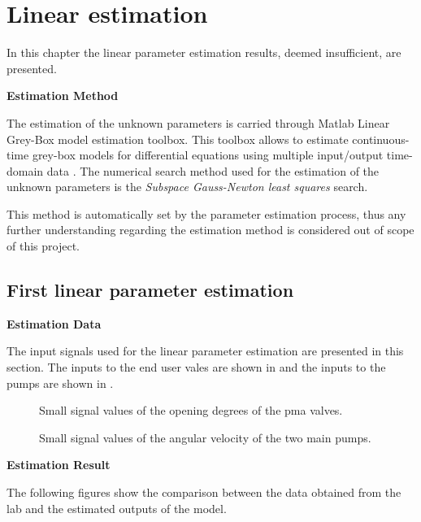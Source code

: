 \chapter{Linear estimation}
\label{LinResults_failed_attempts}
In this chapter the linear parameter estimation results, deemed insufficient, are presented.   

\textbf{Estimation Method}

The estimation of the unknown parameters is carried through Matlab Linear Grey-Box model estimation toolbox. This toolbox allows to estimate continuous-time 
grey-box models for differential equations using multiple input/output time-domain data \cite{LinearEstimation}.
The numerical search method used for the estimation of the unknown parameters is the \textit{Subspace Gauss-Newton least squares} search. 

This method is automatically set by the parameter estimation process, thus any further understanding regarding the estimation method is considered out of 
scope of this project. 

\section{First linear parameter estimation}
\label{LinResults_worst}
\textbf{Estimation Data}

The input signals used for the linear parameter estimation are presented in this section.  
The inputs to the end user vales are shown in  and the inputs to the pumps are shown in . 


\begin{figure}[H]
  \centering
  \begin{minipage}[b]{0.45\textwidth}
     
    \caption{Small signal values of the opening degrees of the pma valves. }
    \label{fig:est_OD_data_w}
  \end{minipage}
  \hfill
  \begin{minipage}[b]{0.45\textwidth}
     
    \caption{Small signal values of the angular velocity of the two main pumps.}
    \label{fig:est_deltap_data_w}
  \end{minipage}
\end{figure}


\textbf{Estimation Result}

The following figures show the comparison between the data obtained from the lab and the estimated outputs of the model.  

